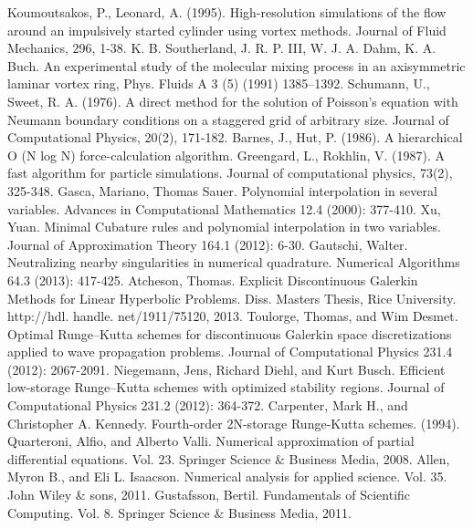 \documentclass[letterpaper,12pt]{report}
\begin{document}
\begin{thebibliography}{8}
Koumoutsakos, P., Leonard, A. (1995). High-resolution simulations of the flow around an impulsively started cylinder using vortex methods. Journal of Fluid Mechanics, 296, 1-38.
K. B. Southerland, J. R. P. III, W. J. A. Dahm, K. A. Buch. An experimental study of the molecular mixing process in an axisymmetric laminar vortex ring, Phys. Fluids A 3 (5) (1991) 1385–1392.
Schumann, U., Sweet, R. A. (1976). A direct method for the solution of Poisson's equation with Neumann boundary conditions on a staggered grid of arbitrary size. Journal of Computational Physics, 20(2), 171-182.
Barnes, J.,  Hut, P. (1986). A hierarchical O (N log N) force-calculation algorithm.
Greengard, L.,  Rokhlin, V. (1987). A fast algorithm for particle simulations. Journal of computational physics, 73(2), 325-348.
Gasca, Mariano, Thomas Sauer. Polynomial interpolation in several variables. Advances in Computational Mathematics 12.4 (2000): 377-410.
Xu, Yuan. Minimal Cubature rules and polynomial interpolation in two variables. Journal of Approximation Theory 164.1 (2012): 6-30.
Gautschi, Walter. Neutralizing nearby singularities in numerical quadrature. Numerical Algorithms 64.3 (2013): 417-425.
Atcheson, Thomas. Explicit Discontinuous Galerkin Methods for Linear Hyperbolic Problems. Diss. Masters Thesis, Rice University. http://hdl. handle. net/1911/75120, 2013.
Toulorge, Thomas, and Wim Desmet. Optimal Runge–Kutta schemes for discontinuous Galerkin space discretizations applied to wave propagation problems. Journal of Computational Physics 231.4 (2012): 2067-2091.
Niegemann, Jens, Richard Diehl, and Kurt Busch. Efficient low-storage Runge–Kutta schemes with optimized stability regions. Journal of Computational Physics 231.2 (2012): 364-372.
Carpenter, Mark H., and Christopher A. Kennedy. Fourth-order 2N-storage Runge-Kutta schemes. (1994).
Quarteroni, Alfio, and Alberto Valli. Numerical approximation of partial differential equations. Vol. 23. Springer Science \& Business Media, 2008.
Allen, Myron B., and Eli L. Isaacson. Numerical analysis for applied science. Vol. 35. John Wiley \& sons, 2011.
Gustafsson, Bertil. Fundamentals of Scientific Computing. Vol. 8. Springer Science \& Business Media, 2011.

\end{thebibliography}
\end{document}
